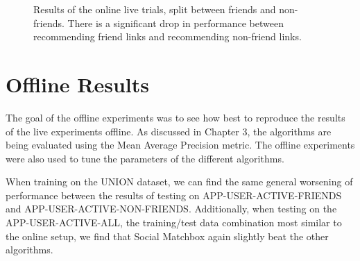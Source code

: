 \begin{figure}[h!]
\caption{Results of the online live trials, split between friends and non-friends. There is a significant drop in performance between recommending friend links and recommending non-friend links.}
\label{fig:OnlineFriend1}
\end{figure}

\section {Offline Results}

The goal of the offline experiments was to see how best to reproduce the results of the live experiments offline. As discussed in Chapter 3, the algorithms are being evaluated using the Mean Average Precision metric. The offline experiments were also used to tune the parameters of the different algorithms. 

When training on the UNION dataset, we can find the same general worsening of performance between the results of testing on APP-USER-ACTIVE-FRIENDS and APP-USER-ACTIVE-NON-FRIENDS. Additionally, when testing on the APP-USER-ACTIVE-ALL, the training/test data combination most similar to the online setup, we find that Social Matchbox again slightly beat the other algorithms.

